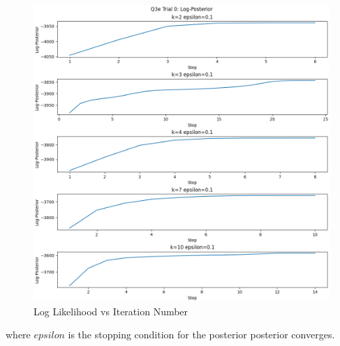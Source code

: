 \documentclass[12pt]{article}
\begin{document}
\begin{enumerate}
\begin{figure}[h]
\centering
\includegraphics[scale=0.35]{outputs/q3/q3e-0-log-pos}
\caption{Log Likelihood vs Iteration Number}
\label{fig:3d-log-like}
\end{figure}

where $epsilon$ is the stopping condition for the posterior posterior converges.

\newpage


\end{enumerate}
\end{document}

